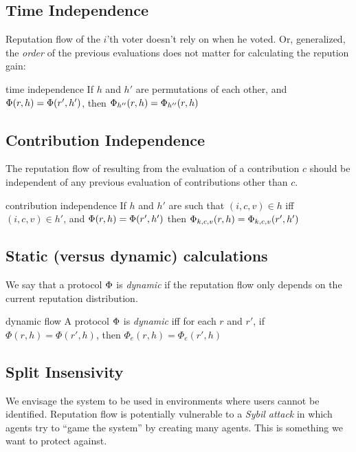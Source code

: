 \documentclass{article}
\begin{document}
\subsection{Time Independence}

Reputation flow of the $i$’th voter doesn’t rely on when he voted. Or, generalized, the {\em order} of the previous evaluations does not matter for calculating the repution gain:
\begin{condition}{time independence}
If $h$ and $h'$ are permutations of each other, and $\Phi(r, h) = \Phi(r', h')$, then $\Phi_{h''}(r, h) = \Phi_{h''}(r, h)$
\end{condition}

\subsection{Contribution Independence}

The reputation flow of resulting from the evaluation of a contribution $c$ should be independent of any previous evaluation of contributions other than $c$.

\begin{condition}{contribution independence}
If $h$ and $h'$ are such that 
$(i, c, v)  \in h$ iff  $(i, c, v) \in h'$, and $\Phi(r, h) = \Phi(r', h')$ then
$\Phi_{k,c,v}(r, h) = \Phi_{k,c,v}(r', h')$
\end{condition}

\subsection{Static (versus dynamic) calculations}

We say that a protocol $\Phi$ is {\em dynamic} if the reputation flow only depends on the current reputation distribution.

\begin{condition}{dynamic flow}
A protocol $\Phi$ is {\em dynamic} iff for each $r$ and $r'$, if $\Phi(r, h) = \Phi(r', h)$, then $\Phi_{e}(r, h) = \Phi_{e}(r', h)$
\end{condition}

\subsection{Split Insensivity}

We envisage the system to be used in environments where users cannot be identified.
Reputation flow is potentially vulnerable to a {\em Sybil attack} in which agents try to ``game the system'' by creating many agents. This is something we want to protect against. 
\end{document}
